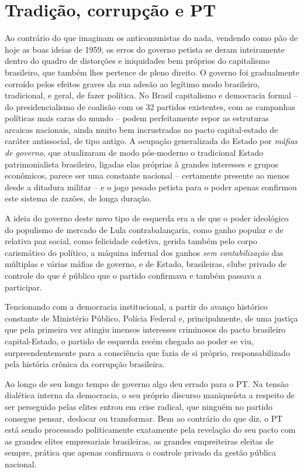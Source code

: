 \chapter{Tradição, corrupção e
PT}\label{tradiuxe7uxe3o-corrupuxe7uxe3o-e-pt}

Ao contrário do que imaginam os anticomunistas do nada, vendendo como
pão de hoje as boas ideias de 1959, os erros do governo petista se deram
inteiramente dentro do quadro de distorções e iniquidades bem próprios
do capitalismo brasileiro, que também lhes pertence de pleno direito. O
governo foi gradualmente corroído pelos efeitos graves da sua adesão ao
legítimo modo brasileiro, tradicional, e geral, de fazer política. No
Brasil capitalismo e democracia formal -- do presidencialismo de
coalisão com os 32 partidos existentes, com as campanhas políticas mais
caras do mundo -- podem perfeitamente repor as estruturas arcaicas
nacionais, ainda muito bem incrustradas no pacto capital-estado de
caráter antissocial, de tipo antigo. A ocupação generalizada do Estado
por \emph{máfias de governo}, que atualizaram de modo pós-moderno o
tradicional Estado patrimonialista brasileiro, ligadas elas próprias à
grandes interesses e grupos econômicos, parece ser uma constante
nacional -- certamente presente ao menos desde a ditadura militar -- e o
jogo pesado petista para o poder apenas confirmou este sistema de
razões, de longa duração.

A ideia do governo deste novo tipo de esquerda era a de que o poder
ideológico do populismo de mercado de Lula contrabalançaria, como ganho
popular e de relativa paz social, como felicidade coletiva, gerida
também pelo corpo carismático do político, a máquina infernal dos ganhos
\emph{sem contabilização} das múltiplas e várias máfias de governo, e de
Estado, brasileiras, clube privado de controle do que é público que o
partido confirmava e também passava a participar.

Tencionando com a democracia institucional, a partir do avanço histórico
constante de Ministério Público, Polícia Federal e, principalmente, de
uma justiça que pela primeira vez atingiu imensos interesses criminosos
do pacto brasileiro capital-Estado, o partido de esquerda recém chegado
ao poder se viu, surpreendentemente para a consciência que fazia de si
próprio, responsabilizado pela história crônica da corrupção brasileira.

Ao longo de seu longo tempo de governo algo deu errado para o PT. Na
tensão dialética interna da democracia, o seu próprio discurso
maniqueísta a respeito de ser perseguido pelas elites entrou em crise
radical, que ninguém no partido consegue pensar, deslocar ou
transformar. Bem ao contrário do que diz, o PT está sendo processado
politicamente exatamente pela revelação do seu pacto com as grandes
elites empresariais brasileiras, as grandes empreiteiras eleitas de
sempre, prática que apenas confirmava o controle privado da gestão
pública nacional.

